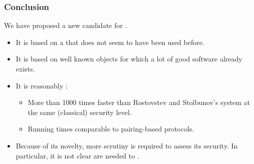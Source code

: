 \documentclass{beamer}
\renewcommand{\emph}[1]{}
\begin{document}

\begin{frame}
  \frametitle{Conclusion}
  
  We have proposed a new candidate for \emph{post-quantum cryptography}.

  \begin{itemize}
  \item It is based on a \emph{new group theoretic construction} that
    does not seem to have been used before.
  \item It is based on well known objects for which a lot of good
    software already exists.
  \item It is reasonably \emph{fast}:
    \begin{itemize}
    \item More than 1000 times faster than Rostovstev and Stolbunov's
      system at the same (classical) security level.
    \item Running times comparable to pairing-based protocols.
    \end{itemize}
  \item Because of its novelty, more scrutiny is required to assess
    its security. In particular, it is not clear \emph{what mathematical
    assumptions} are needed to \emph{prove its security}.
  \end{itemize}
\end{frame}
\end{document}
